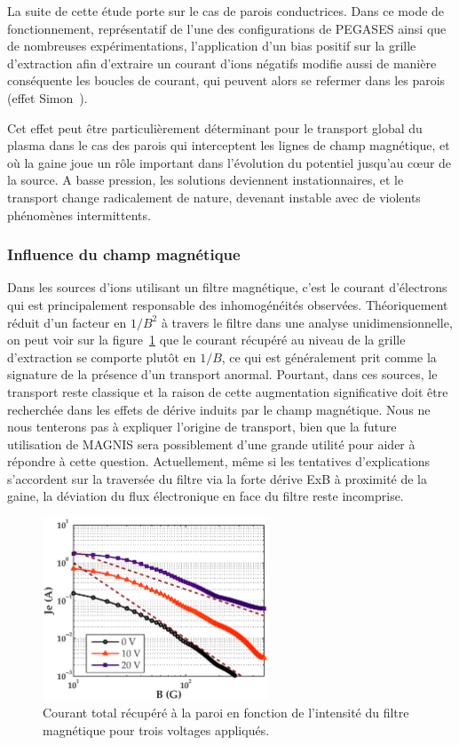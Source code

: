 \begin{refsection}
La suite de cette étude porte sur le cas de parois
conductrices. Dans ce mode de fonctionnement, représentatif de l'une des
configurations de PEGASES ainsi que de nombreuses expérimentations,
l'application d'un bias positif sur la grille d'extraction afin d'extraire un
courant d'ions négatifs modifie aussi de manière conséquente les boucles de
courant, qui peuvent alors se refermer dans les parois (effet
Simon~\parencite{Simon54}).

Cet effet peut être particulièrement déterminant pour le transport global du
plasma dans le cas des parois qui interceptent les lignes de champ magnétique,
et où la gaine joue un rôle important dans l'évolution du potentiel jusqu'au
c\oe{}ur de la source. A basse pression, les solutions deviennent instationnaires, et le transport
change radicalement de nature, devenant instable avec de violents phénomènes
intermittents.
	
\subsubsection{Influence du champ magnétique}
Dans les sources d'ions utilisant un filtre magnétique, c'est le courant
d'électrons qui est principalement responsable des inhomogénéités observées.
Théoriquement réduit d'un facteur en $1/B^2$ à travers le filtre dans une
analyse unidimensionnelle, on peut voir sur la
figure~\ref{pegasesVarMagCourantParoi} que le courant récupéré au niveau de la
grille d'extraction se comporte plutôt en $1/B$, ce qui est
généralement prit comme la signature de la présence d'un transport anormal.
Pourtant, dans ces sources, le transport reste classique et la raison de cette
augmentation significative doit être recherchée dans les effets de dérive
induits par le champ magnétique. Nous ne nous tenterons pas à
expliquer l'origine de transport, bien que la future utilisation de MAGNIS sera
possiblement d'une grande utilité pour aider à répondre à cette question.
Actuellement, même si les tentatives d'explications s'accordent sur la
traversée du filtre via la forte dérive ExB à proximité de la gaine, la
déviation du flux électronique en face du filtre reste incomprise.

\begin{figure}[htbp]
	\centering
	\includegraphics[width=0.6\textwidth]{figures/4-pegasesVarMagCourantParoi.eps}
	{\caption{Courant total récupéré à la paroi en fonction de l'intensité du
	filtre magnétique pour trois voltages appliqués. }
	\label{pegasesVarMagCourantParoi}}
	\end{figure}


\end{refsection}
